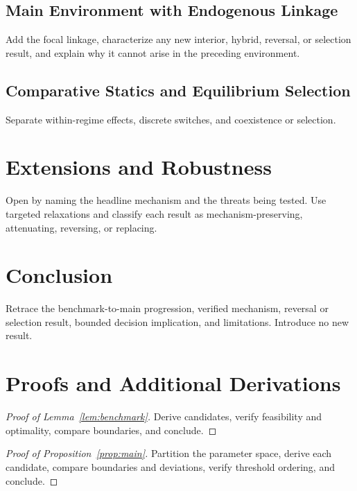 \documentclass[11pt]{article}
\begin{document}
\subsection{Main Environment with Endogenous Linkage}
Add the focal linkage, characterize any new interior, hybrid, reversal, or selection result, and explain why it cannot arise in the preceding environment.

\subsection{Comparative Statics and Equilibrium Selection}
Separate within-regime effects, discrete switches, and coexistence or selection.

\section{Extensions and Robustness}
Open by naming the headline mechanism and the threats being tested. Use targeted relaxations and classify each result as mechanism-preserving, attenuating, reversing, or replacing.

\section{Conclusion}
Retrace the benchmark-to-main progression, verified mechanism, reversal or selection result, bounded decision implication, and limitations. Introduce no new result.


\appendix
\section{Proofs and Additional Derivations}

\begin{proof}[Proof of Lemma~\ref{lem:benchmark}]
Derive candidates, verify feasibility and optimality, compare boundaries, and conclude.
\end{proof}

\begin{proof}[Proof of Proposition~\ref{prop:main}]
Partition the parameter space, derive each candidate, compare boundaries and deviations, verify threshold ordering, and conclude.
\end{proof}
\end{document}
